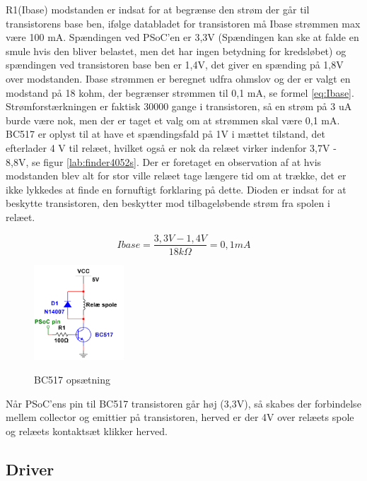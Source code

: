 R1(Ibase) modstanden er indsat for at begrænse den strøm der går til transistorens base ben, ifølge databladet for transistoren må Ibase strømmen max være 100 mA. Spændingen ved PSoC'en er 3,3V (Spændingen kan ske at falde en smule hvis den bliver belastet, men det har ingen betydning for kredsløbet) og spændingen ved transistoren base ben er 1,4V, det giver en spænding på 1,8V over modstanden. Ibase strømmen er beregnet udfra ohmslov og der er valgt en modstand på 18 kohm, der begrænser strømmen til 0,1 mA, se formel \ref{eq:Ibase}.
\newline \newline
Strømforstærkningen er faktisk 30000 gange i transistoren, så en strøm på 3 uA burde være nok, men der er taget et valg om at strømmen skal være 0,1 mA. BC517 er oplyst til at have et spændingsfald på 1V i mættet tilstand, det efterlader 4 V til relæet, hvilket også er nok da relæet virker indenfor 3,7V - 8,8V, se figur \ref{lab:finder4052s}. Der er foretaget en observation af at hvis modstanden blev alt for stor ville relæet tage længere tid om at trække, det er ikke lykkedes at finde en fornuftigt forklaring på dette. Dioden er indsat for at beskytte transistoren, den beskytter mod tilbageløbende strøm fra spolen i relæet.

\begin{equation} 
Ibase = \frac{3,3V - 1,4V}{18k\Omega} = 0,1mA
\label{eq:Ibase}
\end{equation}

\begin{figure}[H] \centering
{\includegraphics[width=0.3\textwidth]{filer/design/Billeder/BC517}}
\caption{BC517 opsætning}
\label{lab:BC517}
\raggedright
\end{figure} 

Når PSoC'ens pin til BC517 transistoren går høj (3,3V), så skabes der forbindelse mellem collector og emittier på transistoren, herved er der 4V over relæets spole og relæets kontaktsæt klikker herved. 

\subsection{Driver}

